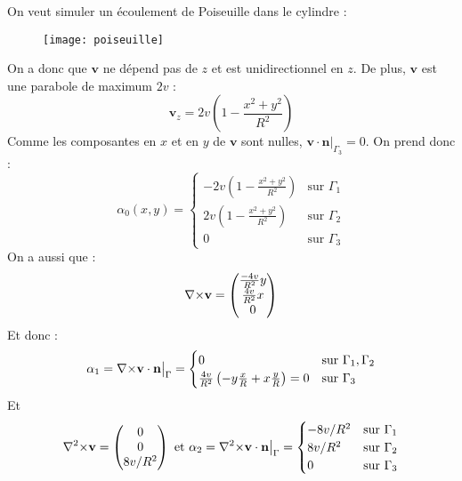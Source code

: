 On veut simuler un écoulement de Poiseuille dans le cylindre :
\begin{figure}[H]
\centering
\texttt{[image: poiseuille]}
\end{figure}
 On a donc que $\mathbf{v}$ ne dépend pas de $z$ et est unidirectionnel en $z$. De plus, $\mathbf{v}$ est une parabole de maximum $2v$ : \[ \mathbf{v}_z=2v\left(1-\frac{x^2+y^2}{R^2}\right)\]
Comme les composantes en $x$ et en $y$ de $\mathbf{v}$ sont nulles, $\mathbf{v}\cdot\mathbf{n}\big\rvert_{\Gamma_3}=0$. On prend donc :
\begin{equation}\label{alpha0}
 \alpha_0(x,y)= \begin{cases} -2v\left(1-\frac{x^2+y^2}{R^2}\right) &\mbox{sur } \Gamma_1\\
2v\left(1-\frac{x^2+y^2}{R^2}\right)&\mbox{sur } \Gamma_2\\
0 &\mbox{sur } \Gamma_3 \end{cases} \end{equation}
On a aussi que :
\[ {\nabla\times}\mathbf{v} = \begin{pmatrix}\frac{-4v}{R^2}y\\\frac{4v}{R^2}x\\0\end{pmatrix}\]
Et donc :\[\alpha_1={\nabla\times}\mathbf{v}\cdot\mathbf{n}{\big\rvert_{\Gamma}} = \begin{cases} 0 &\mbox{sur } \Gamma_1,\Gamma_2\\
\frac{4v}{R^2}\left(-y\frac{x}{R} + x\frac{y}{R}\right) = 0 &\mbox{sur } \Gamma_3 \end{cases} \]
Et
\[ {\nabla^2\times}\mathbf{v} = \begin{pmatrix}0\\0\\8v/R^2\end{pmatrix}\mbox{ et } \alpha_2={\nabla^2\times}\mathbf{v}\cdot\mathbf{n}{\big\rvert_{\Gamma}} = \begin{cases} -8v/R^2 &\mbox{sur } \Gamma_1\\
8v/R^2 &\mbox{sur } \Gamma_2\\ 0 &\mbox{sur } \Gamma_3 \end{cases} \]

